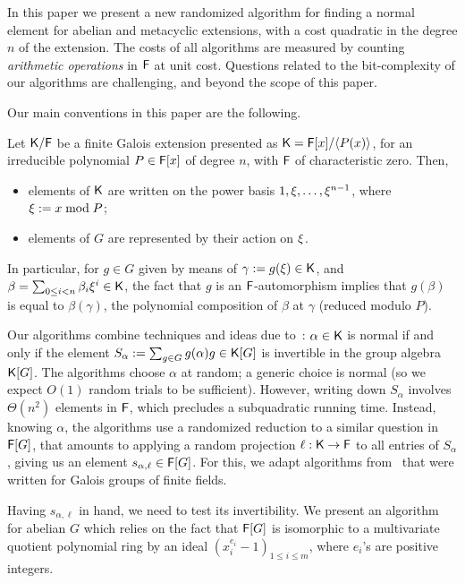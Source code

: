 In this paper we present a new randomized algorithm for finding a normal
element for abelian and metacyclic extensions, with a cost quadratic
in the degree $n$ of the extension. The costs of all algorithms are
measured by counting \emph{arithmetic operations} in ${\mathsf{F}}$ at unit cost.
Questions related to the bit-complexity of our algorithms are challenging,
and beyond the scope of this paper.

Our main conventions in this paper are the following.
\begin{assumption}
  \label{assum}
  Let ${\mathsf{K}}/{\mathsf{F}}$ be a finite Galois extension presented as
  ${\mathsf{K}}={\mathsf{F}}[x]/\langle P(x)\rangle$, for an irreducible polynomial $P\in
  {\mathsf{F}}[x]$ of degree $n$, with ${\mathsf{F}}$ of characteristic zero. Then,
  \begin{itemize}
  \item elements of ${\mathsf{K}}$ are written on the power basis $1,\xi,\dots,\xi^{n-1}$,
    where $\xi := x \bmod P$;
  \item elements of $G$ are represented by their action on $\xi$.
  \end{itemize}
\end{assumption}

In particular, for $g \in G$ given by means of $\gamma:=g(\xi) \in {\mathsf{K}}$,
and $\beta = \sum_{0\leq i<n}\beta_i\xi^i\in{\mathsf{K}}$, the fact that $g$ is an
${\mathsf{F}}$-automorphism implies that $g(\beta)$ is equal to $\beta(\gamma)$, the
polynomial composition of $\beta$ at $\gamma$ (reduced modulo $P$).

Our algorithms combine techniques and ideas due
to~\cite{GatGie90,KalSho98}: $\alpha \in {\mathsf{K}}$ is normal if and only if
the element $S_\alpha := \sum_{g \in G} g(\alpha)g \in {\mathsf{K}}[G]$ is
invertible in the group algebra ${\mathsf{K}}[G]$. The algorithms choose
$\alpha$ at random; a generic choice is normal (so we expect $O(1)$
random trials to be sufficient). However, writing down $S_\alpha$
involves $\Theta(n^2)$ elements in ${\mathsf{F}}$, which precludes a
subquadratic running time. Instead, knowing $\alpha$, the algorithms use a
randomized reduction to a similar question in ${\mathsf{F}}[G]$, that amounts to
applying a random projection $\ell:{\mathsf{K}}\to{\mathsf{F}}$ to all entries of
$S_\alpha$, giving us an element $s_{\alpha,\ell} \in {\mathsf{F}}[G]$. For
this, we adapt algorithms from~\cite{KalSho98} that were written for
Galois groups of finite fields.

Having $s_{\alpha,\ell}$ in hand, we need to test its
invertibility. We present an algorithm for 
abelian $G$ which relies on the fact that ${\mathsf{F}}[G]$ is isomorphic to a
multivariate quotient polynomial ring by an ideal $(x^{e_i}_i-1)_{1
  \leq i \leq m}$, where $e_i$'s are positive integers. 

